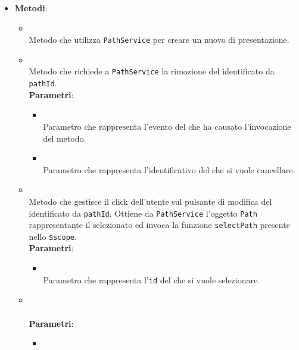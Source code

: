 \begin{itemize}
\begin{itemize}
\\ \dpScopeField
\end{itemize}
\item \textbf{Metodi}:
\begin{itemize}
\item {}
\\ Metodo che utilizza \texttt{PathService} per creare un nuovo  di presentazione.
\item {}
\\ Metodo che richiede a \texttt{PathService} la rimozione del  identificato da \texttt{pathId}.
\\ \textbf{Parametri}:
\begin{itemize}
\item {}
\\ Parametro che rappresenta l'evento del  che ha causato l'invocazione del metodo.
\item {}
\\ Parametro che rappresenta l'identificativo del  che si vuole cancellare.
\end{itemize}
\item {}
\\ Metodo che gestisce il click dell'utente sul pulsante di modifica del  identificato da \texttt{pathId}. Ottiene da \texttt{PathService} l'oggetto \texttt{Path} rappresentante il  selezionato ed invoca la funzione \texttt{selectPath} presente nello \texttt{\$scope}.
\\ \textbf{Parametri}:
\begin{itemize}
\item {}
\\ Parametro che rappresenta l'\texttt{id} del  che si vuole selezionare.
\end{itemize}
\item {}
\\ \dpConstructor
\\ \textbf{Parametri}:
\begin{itemize}
\item {}

\end{itemize}
\end{itemize}
\end{itemize}
